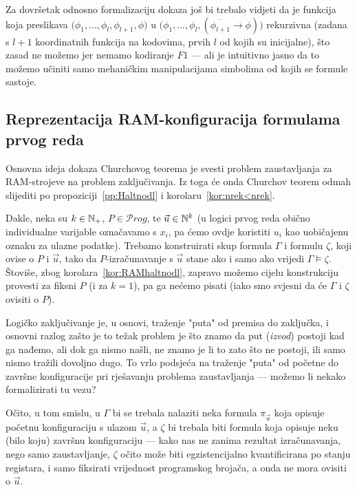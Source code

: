 Za dovršetak odnosno formalizaciju dokaza još bi trebalo vidjeti da je funkcija koja preslikava $\bigl(\phi_1,\dotsc,\phi_l,\phi_{l+1},\phi\bigr)$ u $\bigl(\phi_1,\dotsc,\phi_l,(\overline{\phi_{l+1}}\to\phi)\bigr)$ rekurzivna (zadana s $l+1$ koordinatnih funkcija na kodovima, prvih $l$ od kojih su inicijalne), što zasad ne možemo jer nemamo kodiranje $F1$ --- ali je intuitivno jasno da to možemo učiniti samo mehaničkim manipulacijama simbolima od kojih se formule sastoje.

\subsection{Reprezentacija RAM-konfiguracija formulama prvog reda}

Osnovna ideja dokaza Churchovog teorema je svesti problem zaustavljanja za RAM-strojeve na problem zaključivanja. Iz toga će onda Churchov teorem odmah slijediti po propoziciji~\ref{pp:Haltnodl} i korolaru~\ref{kor:nrek<nrek}.

Dakle, neka su $k\in{\mathbb N}_+$, $P\in\mathscr Prog$, te $\vec u\in{\mathbb N}^k$ (u logici prvog reda obično individualne varijable označavamo s $x_i$, pa ćemo ovdje koristiti $u_i$ kao uobičajenu oznaku za ulazne podatke). Trebamo konstruirati skup formula $\Gamma$ i formulu $\zeta$, koji ovise o $P$ i $\vec u$, tako da $P$-izračunavanje s $\vec u$ stane ako i samo ako vrijedi $\Gamma\models\zeta$. Štoviše, zbog korolara~\ref{kor:RAMhaltnodl}, zapravo možemo cijelu konstrukciju provesti za fiksni $P$ (i za $k=1$), pa ga nećemo pisati (iako smo svjesni da će $\Gamma$ i $\zeta$ ovisiti o $P$).

Logičko zaključivanje je, u osnovi, traženje "puta" od premisa do zaključka, i osnovni razlog zašto je to težak problem je što znamo da put (\emph{izvod}) postoji kad ga nađemo, ali dok ga nismo našli, ne znamo je li to zato što ne postoji, ili samo nismo tražili dovoljno dugo. To vrlo podsjeća na traženje "puta" od početne do završne konfiguracije pri rješavanju problema zaustavljanja --- možemo li nekako formalizirati tu vezu?

Očito, u tom smislu, u $\Gamma$ bi se trebala nalaziti neka formula $\pi_{\vec u}$ koja opisuje početnu konfiguraciju s ulazom $\vec u$, a $\zeta$ bi trebala biti formula koja opisuje neku (bilo koju) završnu konfiguraciju --- kako nas ne zanima rezultat izračunavanja, nego samo zaustavljanje, $\zeta$ očito može biti egzistencijalno kvantificirana po stanju registara, i samo fiksirati vrijednost programskog brojača, a onda ne mora ovisiti o $\vec u$.

